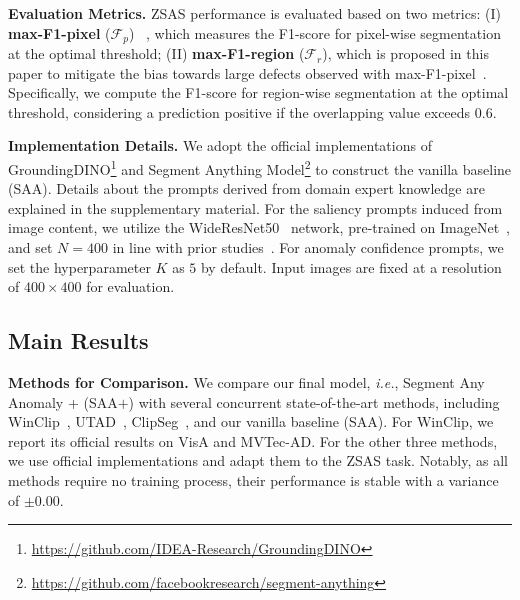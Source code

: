 \noindent\textbf{Evaluation Metrics.} ZSAS performance is evaluated based on two metrics: 
\noindent (I) \textbf{max-F1-pixel} ($\mathcal{F}_{p}$) ~\cite{jeong2023winclip}, which measures the F1-score for pixel-wise segmentation at the optimal threshold; 
\noindent (II) \textbf{max-F1-region} ($\mathcal{F}_{r}$), which is proposed in this paper to mitigate the bias towards large defects observed with max-F1-pixel~\cite{bergmann2019mvtec}. Specifically, we compute the F1-score for region-wise segmentation at the optimal threshold, considering a prediction positive if the overlapping value exceeds $0.6$.

\vspace{0.05in}

\noindent\textbf{Implementation Details.} We adopt the official implementations of GroundingDINO\footnote{\url{https://github.com/IDEA-Research/GroundingDINO}} and Segment Anything Model\footnote{\url{https://github.com/facebookresearch/segment-anything}} to construct the vanilla baseline (SAA). Details about the prompts derived from domain expert knowledge are explained in the supplementary material. For the saliency prompts induced from image content, we utilize the WideResNet50~\cite{zagoruyko2016wideresnet} network, pre-trained on ImageNet~\cite{hinton2012imagenet}, and set $N=400$ in line with prior studies~\cite{aota2023zero}. For anomaly confidence prompts, we set the hyperparameter $K$ as $5$ by default. Input images are fixed at a resolution of $400 \times 400$ for evaluation.

\subsection{Main Results}
\label{sec:exp_main}

\noindent\textbf{Methods for Comparison.}  We compare our final model, \textit{i.e.}, Segment Any Anomaly + (SAA$+$) with several concurrent state-of-the-art methods, including WinClip~\cite{jeong2023winclip}, UTAD~\cite{aota2023zero}, ClipSeg~\cite{clipseg2022}, and our vanilla baseline (SAA). For WinClip, we report its official results on VisA and MVTec-AD. For the other three methods, we use official implementations and adapt them to the ZSAS task. Notably, as all methods require no training process, their performance is stable with a variance of $\pm0.00$. 

